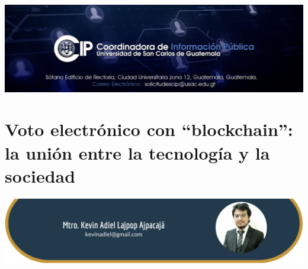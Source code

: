 \documentclass[12pt,spanish,Letterpaper,openany]{book}
\begin{document}
\begin{center}\includegraphics[width=1\linewidth]{images/publicidad6} \end{center}

\hypertarget{kevinlajpop}{%
\chapter{Voto electrónico con ``blockchain'': la unión entre la tecnología y la sociedad}\label{kevinlajpop}}

\begin{center}\includegraphics[width=1\linewidth]{images/kLajpop_image1} \end{center}
\end{document}
